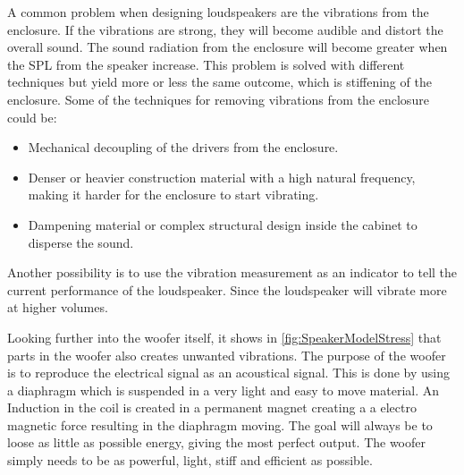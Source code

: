 A common problem when designing loudspeakers are the vibrations from the enclosure. If the vibrations are strong, they will become audible and distort the overall sound. The sound radiation from the enclosure will become greater when the \gls{SPL} from the speaker increase. This problem is solved with different techniques but yield more or less the same outcome, which is stiffening of the enclosure. Some of the techniques for removing vibrations from the enclosure could be:
\begin{itemize}
\item Mechanical decoupling of the drivers from the enclosure.
\item Denser or heavier construction material with a high natural frequency, making it harder for the enclosure to start vibrating.
\item Dampening material or complex structural design inside the cabinet to disperse the sound.
\end{itemize}

Another possibility is to use the vibration measurement as an indicator to tell the current performance of the loudspeaker. Since the loudspeaker will vibrate more at higher volumes. 


Looking further into the woofer itself, it shows in \autoref{fig:SpeakerModelStress} that parts in the woofer also creates unwanted vibrations. The purpose of the woofer is to reproduce the electrical signal as an acoustical signal. This is done by using a diaphragm which is suspended in a very light and easy to move material. An Induction in the coil is created in a permanent magnet creating a a electro magnetic force resulting in the diaphragm moving. The goal will always be to loose as little as possible energy, giving the most perfect output. The woofer simply needs to be as powerful, light, stiff and efficient as possible.

